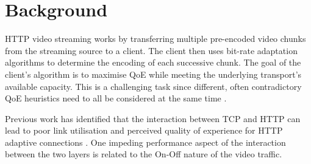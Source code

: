 \documentclass[10pt,sigconf]{acmart}
\begin{document}

\section{Background}
\label{sec:background}


HTTP video streaming works by transferring multiple pre-encoded video chunks from the streaming source to a client. The client then uses bit-rate adaptation algorithms to determine the encoding of each successive chunk. The goal of the client's algorithm is to maximise QoE while meeting the underlying transport's available capacity. This is a challenging task since different, often contradictory QoE heuristics need to all be considered at the same time \cite{Seufert-2015-A-Survey-on-QoE-Dash}. 

Previous work has identified that the interaction between TCP and HTTP can lead to poor link utilisation and perceived quality of experience for HTTP adaptive connections \cite{Bae-2015-why-is-http-streaming-hard,Esteban-2012-Interactions-HTTP-TCP}. One impeding performance aspect of the interaction between the two layers is related to the On-Off nature of the video traffic.
\end{document}
